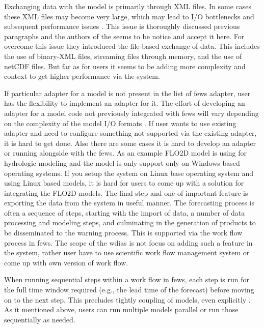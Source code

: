 Exchanging data with the model is primarily through XML files. In some cases these XML files may become very large, which may lead to I/O bottlenecks and subsequent performance issues \cite{Werner2013TheSystem}. This issue is thoroughly discussed previous paragraphs and the authors of the \cite{Werner2013TheSystem} seems to be notice and accept it here. For overcome this issue they introduced the file-based exchange of data. This includes the use of binary-XML files, streaming files through memory, and the use of \acrshort{netCDF} files. But far as for users it seems to be adding more complexity and context to get higher performance via the system.

If particular adapter for a model is not present in the list of \acrshort{fews} adapter, user has the flexibility to implement an adapter for it. The effort of developing an adapter for a model code not previously integrated with \acrshort{fews} will vary depending on the complexity of the model I/O formats \cite{Werner2013TheSystem}. If user wants to use existing adapter and need to configure something not supported via the existing adapter, it is hard to get done. Also there are some cases it is hard to develop an adapter or running alongside with the \acrshort{fews}. As an example FLO2D model is using for hydrologic modeling and the model is only support only on Windows based operating systems. If you setup the system on Linux base operating system and using Linux based models, it is hard for users to come up with a solution for integrating the FLO2D models.
The final step and one of important feature is exporting the data from the system in useful manner.
The forecasting process is often a sequence of steps, starting with the import of data, a number of data processing and modeling steps, and culminating in the generation of products to be disseminated to the warning process. This is supported via the work flow process in \acrshort{fews}. The scope of the \acrshort{wdias} is not focus on adding such a feature in the system, rather user have to use scientific work flow management system or come up with own version of work flow.

When running sequential steps within a work flow in \acrshort{fews}, each step is run for the full time window required (e.g., the lead time of the forecast) before moving on to the next step. This precludes tightly coupling of models, even explicitly \cite{Werner2013TheSystem}. As it mentioned above, users can run multiple models parallel or run those sequentially as needed. 
